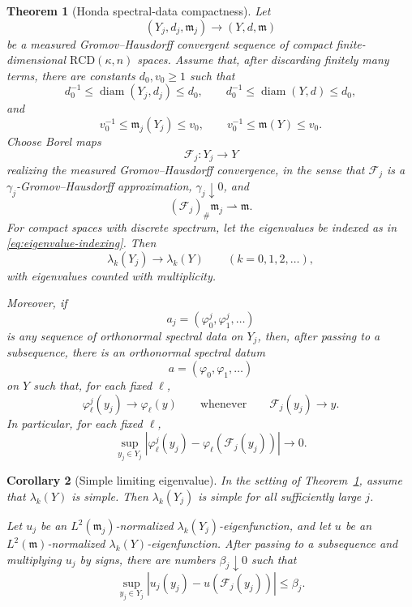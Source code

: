 \documentclass[11pt]{amsart}
\newtheorem{theorem}{Theorem}[section]
\newtheorem{corollary}[theorem]{Corollary}
\numberwithin{equation}{section}
\DeclareMathOperator{\diam}{diam}
\newcommand{\mm}{\mathfrak m}
\newcommand{\RCD}{\mathrm{RCD}}
\begin{document}
\begin{theorem}[Honda spectral-data compactness]\label{thm:honda}
Let
\[
(Y_j,d_j,\mm_j)\longrightarrow (Y,d,\mm)
\]
be a measured Gromov--Hausdorff convergent sequence of compact
finite-dimensional \(\RCD(\kappa,n)\) spaces.  Assume that, after discarding
finitely many terms, there are constants \(d_0,v_0\ge1\) such that
\[
d_0^{-1}\le \diam(Y_j,d_j)\le d_0,\qquad
d_0^{-1}\le \diam(Y,d)\le d_0,
\]
and
\[
v_0^{-1}\le \mm_j(Y_j)\le v_0,\qquad
v_0^{-1}\le \mm(Y)\le v_0 .
\]
Choose Borel maps
\[
\mathcal F_j:Y_j\to Y
\]
realizing the measured Gromov--Hausdorff convergence, in the sense that
\(\mathcal F_j\) is a \(\gamma_j\)-Gromov--Hausdorff approximation,
\(\gamma_j\downarrow0\), and
\[
(\mathcal F_j)_\#\mm_j\rightharpoonup\mm .
\]
For compact spaces with discrete spectrum, let the eigenvalues be indexed as in
\eqref{eq:eigenvalue-indexing}.  Then
\begin{equation}\label{eq:honda-eigenvalue-convergence}
\lambda_k(Y_j)\to\lambda_k(Y)
\qquad(k=0,1,2,\ldots),
\end{equation}
with eigenvalues counted with multiplicity.

Moreover, if
\[
a_j=(\varphi^j_0,\varphi^j_1,\ldots)
\]
is any sequence of orthonormal spectral data on \(Y_j\), then, after passing to a
subsequence, there is an orthonormal spectral datum
\[
a=(\varphi_0,\varphi_1,\ldots)
\]
on \(Y\) such that, for each fixed \(\ell\),
\[
\varphi^j_\ell(y_j)\to \varphi_\ell(y)
\qquad\text{whenever}\qquad
\mathcal F_j(y_j)\to y .
\]
In particular, for each fixed \(\ell\),
\begin{equation}\label{eq:honda-spectral-data-uniform}
\sup_{y_j\in Y_j}
\left|
\varphi^j_\ell(y_j)-\varphi_\ell(\mathcal F_j(y_j))
\right|
\longrightarrow0 .
\end{equation}
\end{theorem}

\begin{corollary}[Simple limiting eigenvalue]\label{cor:honda-simple}
In the setting of Theorem~\ref{thm:honda}, assume that \(\lambda_k(Y)\) is
simple.  Then \(\lambda_k(Y_j)\) is simple for all sufficiently large \(j\).

Let \(u_j\) be an \(L^2(\mm_j)\)-normalized \(\lambda_k(Y_j)\)-eigenfunction, and
let \(u\) be an \(L^2(\mm)\)-normalized \(\lambda_k(Y)\)-eigenfunction.  After
passing to a subsequence and multiplying \(u_j\) by signs, there are numbers
\(\beta_j\downarrow0\) such that
\begin{equation}\label{eq:honda-uniform-with-maps}
\sup_{y_j\in Y_j}
\left|
u_j(y_j)-u(\mathcal F_j(y_j))
\right|
\le \beta_j .
\end{equation}
\end{corollary}
\end{document}
